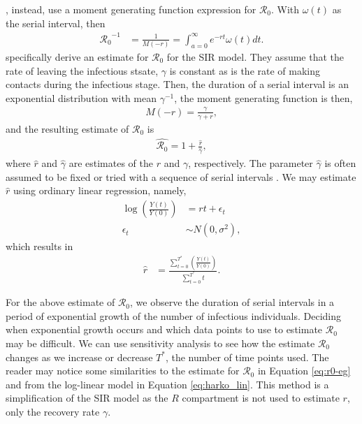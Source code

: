 \documentclass[12pt]{article}
\newcommand{\rr}{\ensuremath{\mathcal{R}_0}}
\begin{document}
\cite{wallinga2007generation}, instead, use a moment generating function expression for $\rr$.  With $\omega(t)$ as the serial interval, then
\begin{align*}
\rr^{-1} &= \frac{1}{M(-r)} = \int_{a=0}^\infty e^{-rt}\omega(t)dt.
\end{align*}
\cite{wallinga2007generation} specifically derive an estimate for $\rr$ for the SIR model.  They assume that the rate of leaving the infectious stsate, $\gamma$ is constant as is the rate of making contacts during the infectious stage.  Then, the duration of a serial interval is an exponential distribution with mean $\gamma^{-1}$, the moment generating function is then,
\begin{align*}
  M(-r) = \frac{\gamma}{\gamma + r},
\end{align*}
and the resulting estimate of $\rr$ is
\begin{align}\label{eq:r0-eg}
  \hat{\rr} = 1 + \frac{\hat{r}}{\hat{\gamma}},
\end{align}
where $\hat{r}$ and $\hat{\gamma}$ are estimates of the $r$ and $\gamma$, respectively.  The parameter $\hat{\gamma}$ is often assumed to be fixed or tried with a sequence of serial intervals \citep{majumder2016}.  We may estimate $\hat{r}$ using ordinary linear regression, namely,
\begin{align*}
  \log \left  (\frac{Y(t)}{Y(0)} \right )&= rt + \epsilon_t\\
  \epsilon_t &\sim N(0, \sigma^2),
\end{align*}
which results in
\begin{align}\label{eq:exp-growth}
  \hat{r} &= \frac{\sum_{t=0}^{T^*}\left  (\frac{Y(t)}{Y(0)} \right )}{\sum_{t=0}^{T^*}t}.
\end{align}



For the above estimate of $\rr$, we observe the duration of serial intervals in a period of exponential growth of the number of infectious individuals.  Deciding when exponential growth occurs and which data points to use to estimate $\rr$ may be difficult.  We can use sensitivity analysis to see how the estimate $\rr$ changes as we increase or decrease $T^{*}$, the number of time points used. The reader may notice some similarities to the estimate for $\rr$ in Equation \eqref{eq:r0-eg} and from the log-linear model in Equation \eqref{eq:harko_lin}.  This method is a simplification of the SIR model as the $R$ compartment is not used to estimate $r$, only the recovery rate $\gamma$. 
\end{document}
